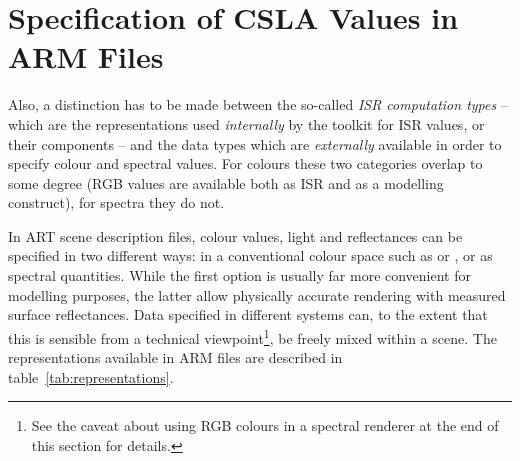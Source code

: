 \chapter{Specification of CSLA Values in ARM Files}


Also, a distinction has to
be made between the so-called \emph{ISR computation types} -- which are
the representations used \emph{internally} by the toolkit for ISR
values, or their components -- and the data types which are \emph{externally} available in
order to specify colour and spectral values. For colours these two categories overlap to some degree (RGB values are available both as ISR and as a modelling construct), for spectra they do not.

In ART scene description files, colour values, light and reflectances can be
specified in two different ways: in a conventional colour space such as
 or , or as spectral quantities. While the first
option is usually far more convenient for modelling purposes, the latter allow physically accurate rendering with measured surface reflectances. Data specified in different systems can, to the extent that this is sensible from a technical viewpoint\footnote{See the caveat about using RGB colours in a spectral renderer at the end of this section for details.}, be freely mixed within a scene. The representations available in ARM files are described in
table~\ref{tab:representations}.

